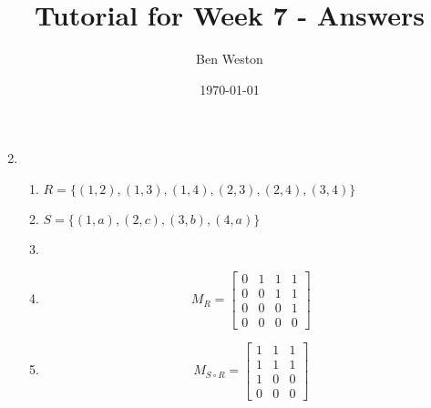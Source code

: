 \documentclass{article}
\title{Tutorial for Week 7 - Answers}
\author{Ben Weston}
\date{\today}
\begin{document}
\maketitle
\begin{enumerate}\setcounter{enumi}{1}
        \item
        \begin{enumerate}
                \item $R=\{(1,2),(1,3),(1,4),(2,3),(2,4),(3,4)\}$
                \item $S=\{(1,a),(2,c),(3,b),(4,a)\}$
                \item {
                                \leavevmode\vadjust{\vspace{-\baselineskip}}\newline
                                \begin{center}
                                \end{center}
                        }
                \item {
                                $$M_R=
                                \begin{bmatrix}
                                        0 & 1 & 1 & 1\\
                                        0 & 0 & 1 & 1\\
                                        0 & 0 & 0 & 1\\
                                        0 & 0 & 0 & 0
                                \end{bmatrix}$$
                        }
                \item {
                                $$M_{S\circ R}=
                                \begin{bmatrix}
                                        1 & 1 & 1\\
                                        1 & 1 & 1\\
                                        1 & 0 & 0\\
                                        0 & 0 & 0
                                \end{bmatrix}$$
                        }

        \end{enumerate}
\end{enumerate}
\end{document}
